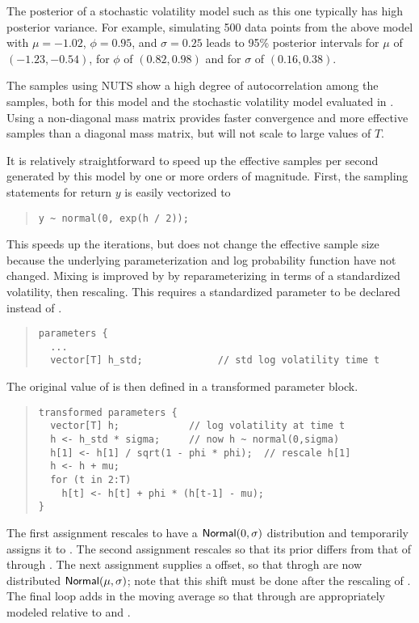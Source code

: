 The posterior of a stochastic volatility model such as this one
typically has high posterior variance.  For example, simulating 500
data points from the above model with $\mu = -1.02$, $\phi = 0.95$,
and $\sigma = 0.25$ leads to 95\% posterior intervals for $\mu$ of
$(-1.23, -0.54)$, for $\phi$ of $(0.82,0.98 )$ and for $\sigma$ of
$(0.16,0.38)$. 

The samples using NUTS show a high degree of autocorrelation among the
samples, both for this model and the stochastic volatility model
evaluated in \citep{Hoffman-Gelman:2011, Hoffman-Gelman:2014}.  
Using a non-diagonal mass
matrix provides faster convergence and more effective samples than a
diagonal mass matrix, but will not scale to large values of $T$.

It is relatively straightforward to speed up the effective samples per
second generated by this model by one or more orders of magnitude.
First, the sampling statements for return $y$ is easily vectorized to
%
\begin{quote}
\begin{Verbatim}[fontsize=\small]
y ~ normal(0, exp(h / 2));
\end{Verbatim}
\end{quote}
%
This speeds up the iterations, but does not change the effective
sample size because the underlying parameterization and log
probability function have not changed.  Mixing is improved by by
reparameterizing in terms of a standardized volatility, then
rescaling.  This requires a standardized parameter  to be
declared instead of .
\begin{quote}
\begin{Verbatim}[fontsize=\small]
parameters {
  ...
  vector[T] h_std;             // std log volatility time t
\end{Verbatim}
\end{quote}
%
The original value of  is then defined in a transformed
parameter block.
%
\begin{quote}
\begin{Verbatim}[fontsize=\small]
transformed parameters {
  vector[T] h;            // log volatility at time t
  h <- h_std * sigma;     // now h ~ normal(0,sigma)
  h[1] <- h[1] / sqrt(1 - phi * phi);  // rescale h[1]
  h <- h + mu;
  for (t in 2:T)
    h[t] <- h[t] + phi * (h[t-1] - mu);
}
\end{Verbatim}
\end{quote}
%
The first assignment rescales  to have a
$\mbox{\sf Normal}(0,\sigma)$ distribution and temporarily assigns it to
.  The second assignment rescales  so that its
prior differs from that of  through .  The next
assignment supplies a  offset, so that  throgh
 are now distributed $\mbox{\sf Normal}(\mu,\sigma)$; note
that this shift must be done after the rescaling of .  The
final loop adds in the moving average so that  through
 are appropriately modeled relative to  and
.

